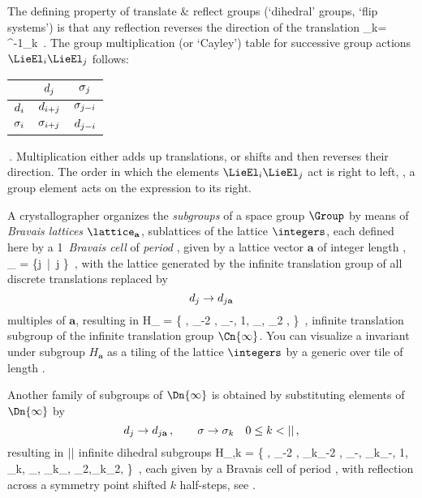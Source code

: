 The defining property of translate \& reflect groups
(`dihedral' groups, `flip systems') is that
any reflection reverses the direction of the translation
\beq
\Refl_{k}\shift = \shift^{-1}\Refl_{k}
\,.
%
The group multiplication (or `Cayley') table for successive group actions
$\LieEl_i\LieEl_j$ follows:
\beq
\begin{tabular}{c|cc}
            &$d_j$        &$\sigma_j$\\\hline
$d_i$  &$d_{i+j}$     &$\sigma_{j-i}$\\
$\sigma_i$   &$\sigma_{i+j}$     &$d_{j-i}$
\end{tabular}
\,.
Multiplication either adds up translations,
or shifts and then reverses their direction.
The order in which the elements $\LieEl_i\LieEl_j$ act is right to left,
\ie, a group element acts on the expression to its right.

A crystallographer organizes the \emph{subgroups} of a space group
$\Group$ by means of \emph{Bravais lattices} $\lattice_\mathbf{a}$,
sublattices of the lattice $\integers$, each defined here by a 1\dmn\
\emph{Bravais cell} of \emph{period} \cl{}, given by a lattice vector
$\mathbf{a}$ of integer length \cl{},
\beq
\lattice_ = \{j  \,|\, j \in \integers\}
\,,
with the lattice generated by the infinite translation group of all
discrete translations replaced by
\[
  d_{j}\to d_{j\mathbf{a}}
\]
multiples of $\mathbf{a}$, resulting in
\beq
H_{} = \{ \cdots, \shift_{-2 }, \shift_{-},
1, \shift_{\mathbf{a}}, \shift_{2 \mathbf{a}}, \cdots\}
\,,
infinite translation subgroup of the infinite translation group
$\Cn{\infty}$. You can visualize a {\lattstate} invariant under subgroup
$H_{\mathbf{a}}$ as a tiling of the lattice $\integers$ by a generic
{\lattstate} over tile of length \cl{}.

Another family of subgroups of
$\Dn{\infty}$ is obtained
by substituting elements of $\Dn{\infty}$  by
\[
  d_{j}\to d_{j\mathbf{a}}
\,,\qquad
    \sigma\to \sigma_{k}
  \quad
     0\leq{k}<{||}
\,,
\]
resulting in ${||}$ infinite dihedral subgroups
\beq
H_{,k} = \{
\cdots, \shift_{-2 }, \Refl_{k}\shift_{-2 },
        \shift_{-\mathbf{a}}, \Refl_{k}\shift_{-},
        1,                    \Refl_{k},
        \shift_{},  \Refl_{k}\shift_{},
        \shift_{2\mathbf{a}},\Refl_{k}\shift_{2\mathbf{a}}, \cdots
             \}
\,,
each given by a {Bravais cell} of period \cl{}, with reflection
across a symmetry point shifted $k$ half-steps, see
.


